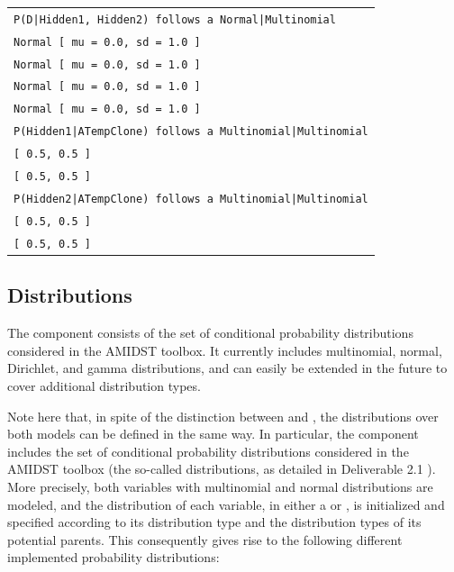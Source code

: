 \begin{table}[H]
{\begin{tabular}{l}
\texttt{P(D|Hidden1, Hidden2) follows a Normal|Multinomial}\\
\texttt{Normal [ mu = 0.0, sd = 1.0 ]}\\
\texttt{Normal [ mu = 0.0, sd = 1.0 ]}\\
\texttt{Normal [ mu = 0.0, sd = 1.0 ]}\\
\texttt{Normal [ mu = 0.0, sd = 1.0 ]}\\

\texttt{P(Hidden1|ATempClone) follows a Multinomial|Multinomial}\\
\texttt{[ 0.5, 0.5 ]}\\
\texttt{[ 0.5, 0.5 ]}\\
\texttt{P(Hidden2|ATempClone) follows a Multinomial|Multinomial}\\
\texttt{[ 0.5, 0.5 ]}\\
\texttt{[ 0.5, 0.5 ]}\\

\end{tabular}}
\end{table}


\subsection{Distributions} \label{subsec:Distributions}

The  component consists of the set of conditional probability distributions considered in the AMIDST toolbox. It currently includes multinomial, normal, Dirichlet, and gamma distributions, and can easily be extended in the future to cover additional distribution types.

Note here that, in spite of the distinction between  and , the distributions over both models can be defined in the same way. In particular, the  component includes the set of conditional probability distributions considered in the AMIDST toolbox (the so-called  distributions, as detailed in Deliverable 2.1 \cite{Deliverable2.1}). More precisely, both variables with multinomial and normal distributions are modeled, and the distribution of each variable, in either a  or , is initialized and specified according to its distribution type and the distribution types of its potential parents. This consequently gives rise to the following different implemented probability distributions:

